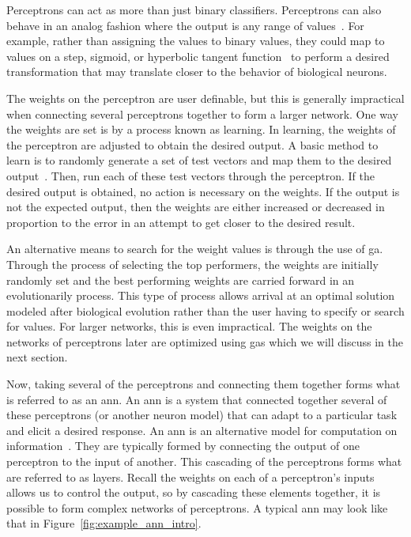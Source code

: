 Perceptrons can act as more than just binary classifiers. Perceptrons can also behave in an analog fashion where the output is any range of values~\cite{Rosenblatt1958-yq}. For example, rather than assigning the values to binary values, they could map to values on a step, sigmoid, or hyperbolic tangent function~\cite{Rojas1996-yd} to perform a desired transformation that may translate closer to the behavior of biological neurons.

The weights on the perceptron are user definable, but this is generally impractical when connecting several perceptrons together to form a larger network. One way the weights are set is by a process known as learning. In learning, the weights of the perceptron are adjusted to obtain the desired output. A basic method to learn is to randomly generate a set of test vectors and map them to the desired output~\cite{Rojas1996-yd}. Then, run each of these test vectors through the perceptron. If the desired output is obtained, no action is necessary on the weights. If the output is not the expected output, then the weights are either increased or decreased in proportion to the error in an attempt to get closer to the desired result.

An alternative means to search for the weight values is through the use of \acrfull{ga}. Through the process of selecting the top performers, the weights are initially randomly set and the best performing weights are carried forward in an evolutionarily process. This type of process allows arrival at an optimal solution modeled after biological evolution rather than the user having to specify or search for values. For larger networks, this is even impractical. The weights on the networks of perceptrons later are optimized using \glspl{ga} which we will discuss in the next section.

Now, taking several of the perceptrons and connecting them together forms what is referred to as an \acrfull{ann}. An \gls{ann} is a system that connected together several of these perceptrons (or another neuron model) that can adapt to a particular task and elicit a desired response. An \gls{ann} is an alternative model for computation on information~\cite{Rojas1996-yd}. They are typically formed by connecting the output of one perceptron to the input of another. This cascading of the perceptrons forms what are referred to as layers. Recall the weights on each of a perceptron's inputs allows us to control the output, so by cascading these elements together, it is possible to form complex networks of perceptrons. A typical \gls{ann} may look like that in Figure~\ref{fig:example_ann_intro}. 

